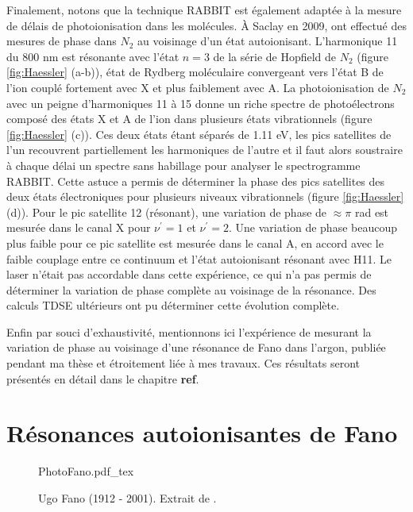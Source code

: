 Finalement, notons que la technique RABBIT est également adaptée à la mesure de délais de photoionisation dans les molécules. \`A Saclay en 2009,  ont effectué des mesures de phase dans $N_2$ au voisinage d'un état autoionisant. L'harmonique 11 du 800 nm est résonante avec l'état $n=3$ de la série de Hopfield de $N_2$ (figure \ref{fig:Haessler} (a-b)), état de Rydberg moléculaire convergeant vers l'état B de l'ion couplé fortement avec X et plus faiblement avec A. La photoionisation de $N_2$ avec un peigne d'harmoniques 11 à 15 donne un riche spectre de photoélectrons composé des états X et A de l'ion dans plusieurs états vibrationnels (figure \ref{fig:Haessler} (c)). Ces deux états étant séparés de 1.11 eV, les pics satellites de l'un recouvrent partiellement les harmoniques de l'autre et il faut alors soustraire à chaque délai un spectre sans habillage pour analyser le spectrogramme RABBIT. Cette astuce a permis de déterminer la phase des pics satellites des deux états électroniques pour plusieurs niveaux vibrationnels (figure \ref{fig:Haessler} (d)). Pour le pic satellite 12 (résonant), une variation de phase de $\approx \pi$ rad est mesurée dans le canal X pour $\nu^{'} = 1$ et $\nu^{'} = 2$. Une variation de phase beaucoup plus faible pour ce pic satellite est mesurée dans le canal A, en accord avec le faible couplage entre ce continuum et l'état autoionisant résonant avec H11. Le laser n'était pas accordable dans cette expérience, ce qui n'a pas permis de déterminer la variation de phase complète au voisinage de la résonance. Des calculs TDSE ultérieurs  ont pu déterminer cette évolution complète.

Enfin par souci d'exhaustivité, mentionnons ici l'expérience de  mesurant la variation de phase au voisinage d'une résonance de Fano dans l'argon, publiée pendant ma thèse et étroitement liée à mes travaux. Ces résultats seront présentés en détail dans le chapitre \textbf{ref}.

\chapter{Résonances autoionisantes de Fano}
\begin{figure}[h]
\centering
\def\svgwidth{0.3\textwidth}
{PhotoFano.pdf_tex}
\caption{Ugo Fano (1912 - 2001). Extrait de .}
\label{fig:PhotoFano}
\end{figure}

